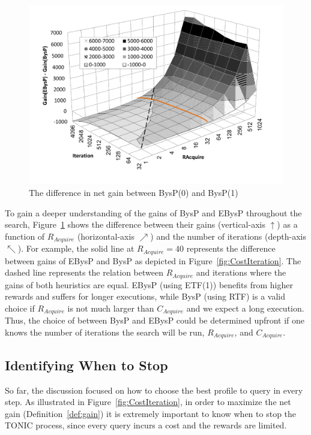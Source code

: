\documentclass[journal]{IEEEtran}
\begin{document}
\begin{figure}
\centering
\includegraphics[width=0.9\linewidth]{reward.pdf}%
\caption{The difference in net gain between BysP(0) and BysP(1)}%
\label{fig:reward3d}
\end{figure}



To gain a deeper understanding of the gains of BysP and EBysP throughout the
search, Figure~\ref{fig:reward3d} shows the difference between their gains (vertical-axis $\uparrow$) as a function of \(R_{Acquire}\)
(horizontal-axis $\nearrow$) and the number of iterations (depth-axis
$\nwarrow$). For example, the solid line at \(R_{Acquire}=40\) represents the
difference between gains of EBysP and BysP as depicted in
Figure~\ref{fig:CostIteration}. The dashed line represents the relation between
\(R_{Acquire}\) and iterations where the gains of both heuristics are equal. EBysP (using ETF(1))
benefits from higher rewards and suffers for longer executions, while BysP (using RTF) is a valid choice if $R_{Acquire}$ is not much larger than $C_{Acquire}$ and we expect a long execution. 
Thus, the choice of between BysP and EBysP could be determined upfront if one knows the
number of iterations the search will be run, $R_{Acquire}$, and $C_{Acquire}$. 

\subsection{Identifying When to Stop}
\label{sec:stopping}
So far, the discussion focused on how to choose the best profile to query in every step. 
As illustrated in Figure~\ref{fig:CostIteration}, in order to maximize the net gain (Definition~\ref{def:gain}) it is extremely important to know when to stop the TONIC process, since every query incurs a cost and the rewards are limited. %
\end{document}
